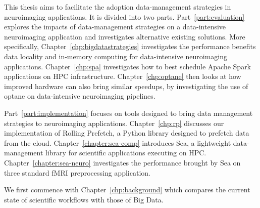 	This thesis aims to facilitate the adoption data-management strategies in neuroimaging applications. 
        It is divided into two parts.
        Part~\ref{part:evaluation} explores the impacts of data-management strategies
        on a data-intensive neuroimaging application
        and investigates alternative existing solutions. More specifically,
        Chapter~\ref{chp:bigdatastrategies} investigates the performance
        benefits data locality and in-memory computing for data-intensive
        neuroimaging applications. Chapter~\ref{chp:spa} investigates how to
        best schedule Apache Spark applications on HPC infrastructure.
        Chapter~\ref{chp:optane} then looks at how improved hardware can also
        bring similar speedups, by investigating the use of \gls{optane} on data-intensive neuroimaging pipelines.

        Part~\ref{part:implementation} focuses on tools designed to bring
        data management strategies to neuroimaging applications. Chapter~\ref{chp:rp}
        discusses our implementation of Rolling Prefetch, a Python library designed to
        prefetch data from the cloud. Chapter~\ref{chapter:sea-comp} introduces Sea, a lightweight 
        data-management library for scientific applications executing on HPC. Chapter~\ref{chapter:sea-neuro}
        investigates the performance brought by Sea on three standard fMRI preprocessing application.

        We first commence with Chapter~\ref{chp:background} which compares the current state of scientific workflows
        with those of Big Data.


